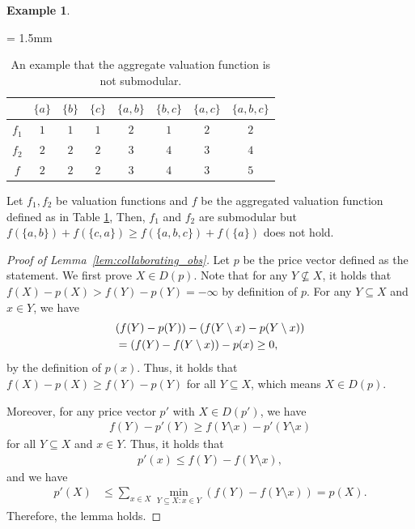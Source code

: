 \documentclass[letterpaper]{article}
\theoremstyle{definition}
\newtheorem{example}[theorem]{Example}
\begin{document}
\begin{example}
\label{ex:nonsubmodular}
\begin{table}[ht]
\centering
\caption{An example that the aggregate valuation function is not submodular.}
\label{tab:nonsubmodular}
{\tabcolsep = 1.5mm
\begin{tabular}{c|ccccccc}
\hline
      & $\{a\}$ & $\{b\}$ & $\{c\}$ & $\{a,b\}$ & $\{b,c\}$ & $\{a,c\}$ & $\{a,b,c\}$\\\hline
$f_1$ & $1$     & $1$     & $1$     & $2$       & $1$       & $2$       & $2$  \\\hline
$f_2$ & $2$     & $2$     & $2$     & $3$       & $4$       & $3$       & $4$  \\\hline
$f$   & $2$     & $2$     & $2$     & $3$       & $4$       & $3$       & $5$  \\\hline
\end{tabular}
}
\end{table}

Let $f_1,f_2$ be valuation functions
and $f$ be the aggregated valuation function
defined as in Table \ref{tab:nonsubmodular},
Then, $f_1$ and $f_2$ are submodular but $f(\{a,b\}) + f(\{c,a\}) \ge f(\{a,b,c\}) + f(\{a\})$ does not hold.
\end{example}

\begin{proof}[Proof of Lemma~\ref{lem:collaborating_obs}]
Let $p$ be the price vector defined as the statement. 
We first prove $X \in D(p)$.
Note that for any $Y \not\subseteq X$, it holds that $f(X) - p(X) > f(Y) - p(Y) = -\infty$ by definition of $p$. 
For any \(Y\subseteq X\) and \(x\in Y\), we have
\begin{align}
  &(f(Y)-p(Y))-(f(Y\setminus x)-p(Y\setminus x))\notag\\
  &= (f(Y) - f(Y\setminus x)) - p(x)\ge 0,
\end{align}
by the definition of \(p(x)\).
Thus, it holds that \(f(X)-p(X)\ge f(Y)-p(Y)\) for all \(Y \subseteq X\), which means $X \in D(p)$.

Moreover, for any price vector $p'$ with $X \in D(p')$, we have 
\begin{align}
  f(Y) - p'(Y) \ge f(Y \setminus x) - p'(Y \setminus x)
\end{align}
for all $Y\subseteq X$ and $x \in Y$. 
Thus, it holds that
\begin{align}
  p'(x) \le f(Y) - f(Y \setminus x),
\end{align}
and we have
\begin{align}
  p'(X)
  &\le \sum_{x \in X} \min_{Y\subseteq X: x\in Y}(f(Y) - f(Y \setminus x)) = p(X).
\end{align}
Therefore, the lemma holds.
\end{proof}
\end{document}
